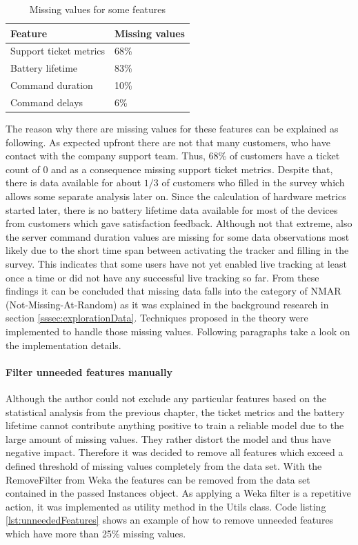 \begin{table}[]
	\centering
	\begin{tabular}{|l|l|}
		\hline
		\textbf{Feature}         & \textbf{Missing values} \\ \hline
		Support ticket metrics   & 68\%                    \\ \hline
		Battery lifetime & 83\%                    \\ \hline
		Command duration         & 10\%                    \\ \hline
		Command delays           & 6\%                     \\ \hline
	\end{tabular}
	\caption{Missing values for some features}
	\label{tab:preprocessingStatistics}
\end{table}

The reason why there are missing values for these features can be explained as following. As expected upfront there are not that many customers, who have contact with the company support team. Thus, 68\% of customers have a ticket count of 0 and as a consequence missing support ticket metrics. Despite that, there is data available for about $1/3$ of customers who filled in the survey which allows some separate analysis later on. Since the calculation of hardware metrics started later, there is no battery lifetime data available for most of the devices from customers which gave satisfaction feedback. Although not that extreme, also the server command duration values are missing for some data observations most likely due to the short time span between activating the tracker and filling in the survey. This indicates that some users have not yet enabled live tracking at least once a time or did not have any successful live tracking so far. From these findings it can be concluded that missing data falls into the category of NMAR (Not-Missing-At-Random) as it was explained in the background research in section \ref{sssec:explorationData}. Techniques proposed in the theory were implemented to handle those missing values. Following paragraphs take a look on the implementation details. 

\paragraph{Filter unneeded features manually}
Although the author could not exclude any particular features based on the statistical analysis from the previous chapter, the ticket metrics and the battery lifetime cannot contribute anything positive to train a reliable model due to the large amount of missing values. They rather distort the model and thus have negative impact. Therefore it was decided to remove all features which exceed a defined threshold of missing values completely from the data set. With the RemoveFilter from Weka the features can be removed from the data set contained in the passed Instances object. As applying a Weka filter is a repetitive action, it was implemented as utility method in the Utils class. Code listing \ref{lst:unneededFeatures} shows an example of how to remove unneeded features which have more than 25\% missing values.

